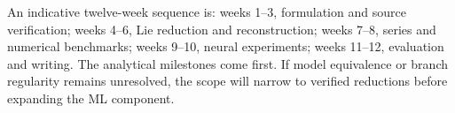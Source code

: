 \documentclass[12pt,a4paper]{article}
\begin{document}
An indicative twelve-week sequence is: weeks 1--3, formulation and source verification; weeks 4--6, Lie reduction and reconstruction; weeks 7--8, series and numerical benchmarks; weeks 9--10, neural experiments; weeks 11--12, evaluation and writing. The analytical milestones come first. If model equivalence or branch regularity remains unresolved, the scope will narrow to verified reductions before expanding the ML component.
\end{document}
